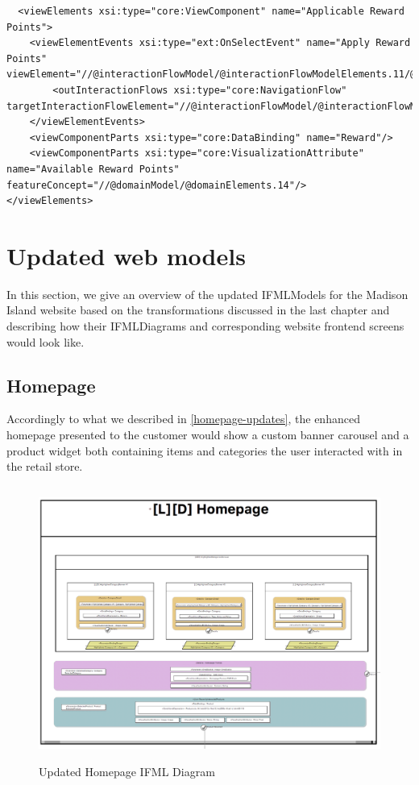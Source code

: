 \vspace{0.5cm}
\lstset{language=XML}
\begin{lstlisting} 
  <viewElements xsi:type="core:ViewComponent" name="Applicable Reward Points">
    <viewElementEvents xsi:type="ext:OnSelectEvent" name="Apply Reward Points" viewElement="//@interactionFlowModel/@interactionFlowModelElements.11/@viewElements.2/@viewElements.3">
        <outInteractionFlows xsi:type="core:NavigationFlow" targetInteractionFlowElement="//@interactionFlowModel/@interactionFlowModelElements.18/@actionEvents.0"/>
    </viewElementEvents>
    <viewComponentParts xsi:type="core:DataBinding" name="Reward"/>
    <viewComponentParts xsi:type="core:VisualizationAttribute"  name="Available Reward Points" featureConcept="//@domainModel/@domainElements.14"/>
</viewElements>
\end{lstlisting}
\vspace{0.5cm}

\section{Updated web models}

In this section, we give an overview of the updated IFMLModels for the Madison Island website based on the transformations discussed in the last chapter and describing how their IFMLDiagrams and corresponding website frontend screens would look like.

\newpage
\subsection{Homepage}

Accordingly to what we described in \ref{homepage-updates}, the enhanced homepage presented to the customer would show a custom banner carousel and a product widget both containing items and categories the user interacted with in the retail store.

\vspace{0.5cm}
\begin{figure}[H]
  \centering
    \includegraphics[height=9cm]{images/diagrams/after/ifml-homepage.png}
  \caption{Updated Homepage IFML Diagram}
  \label{fig:ifml-after-homepage}
\end{figure}

